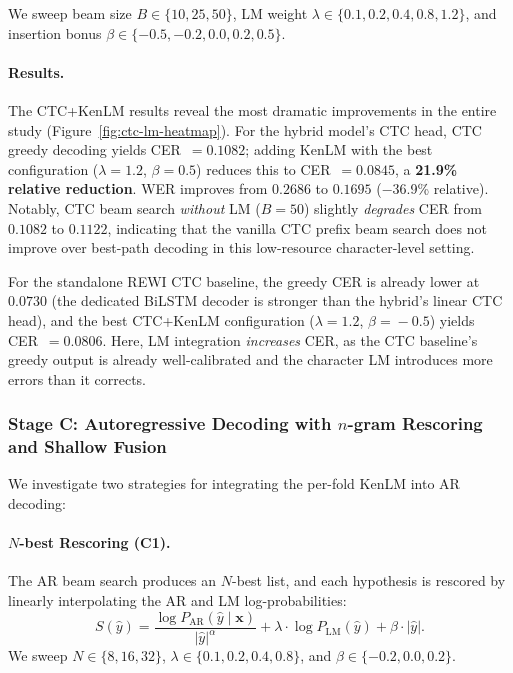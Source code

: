 We sweep beam size $B \in \{10, 25, 50\}$, LM weight $\lambda \in \{0.1, 0.2, 0.4, 0.8, 1.2\}$, and insertion bonus $\beta \in \{-0.5, -0.2, 0.0, 0.2, 0.5\}$.

\paragraph{Results.}
The CTC+KenLM results reveal the most dramatic improvements in the entire study (Figure~\ref{fig:ctc-lm-heatmap}).
For the hybrid model's CTC head, CTC greedy decoding yields CER~$=0.1082$; adding KenLM with the best configuration ($\lambda\!=\!1.2$, $\beta\!=\!0.5$) reduces this to CER~$=0.0845$, a \textbf{21.9\% relative reduction}.
WER improves from $0.2686$ to $0.1695$ ($-$36.9\% relative).
Notably, CTC beam search \emph{without} LM ($B\!=\!50$) slightly \emph{degrades} CER from $0.1082$ to $0.1122$, indicating that the vanilla CTC prefix beam search does not improve over best-path decoding in this low-resource character-level setting.

For the standalone REWI CTC baseline, the greedy CER is already lower at $0.0730$ (the dedicated BiLSTM decoder is stronger than the hybrid's linear CTC head), and the best CTC+KenLM configuration ($\lambda\!=\!1.2$, $\beta\!=\!-0.5$) yields CER~$=0.0806$.
Here, LM integration \emph{increases} CER, as the CTC baseline's greedy output is already well-calibrated and the character LM introduces more errors than it corrects.


\subsubsection{Stage C: Autoregressive Decoding with $n$-gram Rescoring and Shallow Fusion}
\label{sec:decode-stage-c}

We investigate two strategies for integrating the per-fold KenLM into AR decoding:

\paragraph{$N$-best Rescoring (C1).}
The AR beam search produces an $N$-best list, and each hypothesis is rescored by linearly interpolating the AR and LM log-probabilities:
\begin{equation}
    S(\hat{y}) = \frac{\log P_\text{AR}(\hat{y} \mid \mathbf{x})}{|\hat{y}|^{\alpha}} + \lambda \cdot \log P_\text{LM}(\hat{y}) + \beta \cdot |\hat{y}|.
    \label{eq:ar-rescore}
\end{equation}
We sweep $N \in \{8, 16, 32\}$, $\lambda \in \{0.1, 0.2, 0.4, 0.8\}$, and $\beta \in \{-0.2, 0.0, 0.2\}$.

